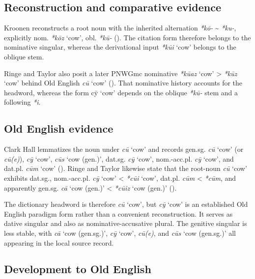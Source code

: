 \documentclass[
  british,
  a4paper,
  openany]{book}
\providecommand{\Recon}[1]{\emph{*#1}}
{\catcode`→=\active \global\def→{\ensuremath{\rightarrow}}}
\providecommand{\Recon}[1]{\emph{*#1}}
{\catcode`→=\active \global\def→{\ensuremath{\rightarrow}}}
\begin{document}
\subsection{Reconstruction and comparative
evidence}\label{reconstruction-and-comparative-evidence-111}

Kroonen reconstructs a root noun with the inherited alternation
\emph{*kō-} \textasciitilde{} \emph{*ku-}, explicitly nom.
\emph{\Recon{kōz}} `cow', obl. \emph{*kū-}
(). The citation form
therefore belongs to the nominative singular, whereas the derivational
input \Recon{kūi} `cow' belongs to the oblique stem.

Ringe and Taylor also posit a later PNWGmc nominative \Recon{kūaz} `cow'
\textgreater{} \Recon{kūz} `cow' behind Old English {\emph{cū}} `cow'
().
That nominative history accounts for the headword, whereas the form cȳ
`cow' depends on the oblique \emph{*kū-} stem and a following \emph{*i}.

\subsection{Old English evidence}\label{old-english-evidence-111}

Clark Hall lemmatizes the noun under {\emph{cū}} `cow' and records
gen.sg. {\emph{cū}} `cow' (or {\emph{cū(e)}}), {\emph{cȳ}} `cow',
{\emph{cūs}} `cow (gen.)', dat.sg. {\emph{cȳ}} `cow', nom.-acc.pl.
{\emph{cȳ}} `cow', and dat.pl. \emph{cūm} `cow'
(). Ringe and Taylor
likewise state that the root-noun {\emph{cū}} `cow' exhibits dat.sg.,
nom.-acc.pl. {\emph{cȳ}} `cow' \textless{} \Recon{cūi} `cow', dat.pl.
\emph{cūm} \textless{} \emph{*cūm}, and apparently gen.sg. {\emph{cā}}
`cow (gen.)' \textless{} \Recon{cūiz} `cow (gen.)'
().

The dictionary headword is therefore {\emph{cū}} `cow', but {\emph{cȳ}}
`cow' is an established Old English paradigm form rather than a
convenient reconstruction. It serves as dative singular and also as
nominative-accusative plural. The genitive singular is less stable, with
{\emph{cā}} `cow (gen.sg.)', {\emph{cȳ}} `cow', \emph{cū(e)}, and
{\emph{cūs}} `cow (gen.sg.)' all appearing in the local source record.

\subsection{Development to Old
English}\label{development-to-old-english-111}
\end{document}
